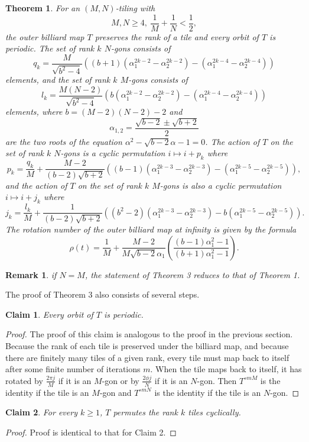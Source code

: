 \documentclass[11pt, oneside]{article}   	%
\newtheorem{theorem}{Theorem}
\newtheorem{claim}{Claim}
\newtheorem{remark}{Remark}
\begin{document}
\begin{theorem}
For an $(M,N)$-tiling with
$$M,N\geq 4,\ \frac{1}{M} + \frac{1}{N} < \frac{1}{2},$$
the outer billiard map $T$ preserves the rank of a tile and every orbit of $T$ is periodic. 
The set of rank $k$ $N$-gons consists of 
$$
q_k = \frac{M}{\sqrt{b^2-4}}\left( 
(b+1)(\alpha_1^{2k-2} - \alpha_2^{2k-2}) 
 - (\alpha_1^{2k-4}-\alpha_2^{2k-4})
\right)
$$
elements, and the set of rank $k$ $M$-gons consists of
$$
l_k = \frac{M(N-2)}{\sqrt{b^2-4}}
\left(
b(\alpha_1^{2k-2} - \alpha_2^{2k-2}) 
- (\alpha_1^{2k-4}-\alpha_2^{2k-4} )
\right)
$$
elements, where
$b = (M-2)(N-2)-2$ and
$$\alpha_{1,2} = \frac{\sqrt{b-2} \pm \sqrt{b+2}}{2}$$
are the two roots of the equation $\alpha^2-\sqrt{b-2}\alpha-1=0$. The action of $T$ on the set of rank $k$ $N$-gons is a cyclic permutation $i\mapsto i+p_k$ where 
\[p_k=\frac{q_k}{M} + \frac{M-2}{(b-2)\sqrt{b+2}}\left((b-1)(\alpha_1^{2k-3}-\alpha_2^{2k-3})-(\alpha_1^{2k-5}-\alpha_2^{2k-5})\right),
\]
and the action of $T$ on the set of rank $k$ $M$-gons is also a cyclic permutation $i\mapsto i+j_k$ where 
\[j_k= \frac{l_k}{M} + \frac{1}{(b-2)\sqrt{b+2}}\left(
 (b^2-2)(\alpha_1^{2k-3}-\alpha_2^{2k-3})-b(\alpha_1^{2k-5} - \alpha_2^{2k-5}) \right).
\]
The rotation number of the outer billiard map at infinity is given by the formula 
\[\rho(t)=\frac{1}{M} + \frac{M-2}{M\sqrt{b-2}\alpha_1}
\left( \frac{(b-1)\alpha_1^2-1}{(b+1)\alpha_1^2-1} \right). \]
\end{theorem}

\begin{remark}
{\rm
if $N=M$, the statement of Theorem 3 reduces to that of Theorem 1.
}
\end{remark}

The proof of Theorem 3 also consists of several steps.

\begin{claim} Every orbit of $T$ is periodic.
\end{claim}
\begin{proof}
The proof of this claim is analogous to the proof in the previous section. Because the rank of each tile is preserved under the billiard map, and because there are finitely many tiles of a given rank, every tile must map back to itself after some finite number of iterations $m$. When the tile maps back to itself, it has rotated by $\frac{2\pi j}{M}$ if it is an $M$-gon or by $\frac{2\phi j}{N}$ if it is an $N$-gon. Then $T^{\circ mM}$ is the identity if the tile is an $M$-gon and $T^{\circ mN}$ is the identity if the tile is an $N$-gon. 
\end{proof}
\begin{claim} For every $k\geq 1$, $T$ permutes the rank $k$ tiles cyclically. \end{claim}
\begin{proof} Proof is identical to that for Claim 2. \end{proof}
\end{document}
